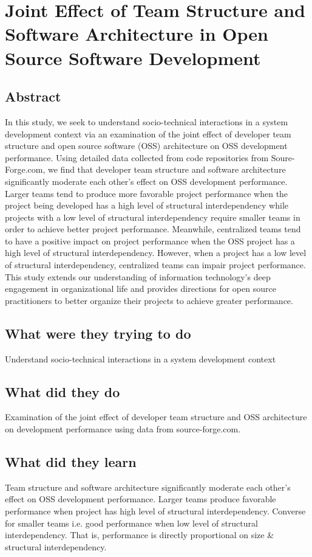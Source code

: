 \section{Joint Effect of Team Structure and Software Architecture in Open Source Software Development}

\subsection{Abstract}

In this study, we seek to understand socio-technical interactions in a system development context via an examination of the joint effect of developer team structure and open source software (OSS) architecture on OSS development performance. Using detailed data collected from code repositories from Soure-Forge.com, we find that developer team structure and software architecture significantly moderate each other's effect on OSS development performance. Larger teams tend to produce more favorable project performance when the project being developed has a high level of structural interdependency while projects with a low level of structural interdependency require smaller teams in order to achieve better project performance. Meanwhile, centralized teams tend to have a positive impact on project performance when the OSS project has a high level of structural interdependency. However, when a project has a low level of structural interdependency, centralized teams can impair project performance. This study extends our understanding of information technology's deep engagement in organizational life and provides directions for open source practitioners to better organize their projects to achieve greater performance.

\subsection{What were they trying to do}

Understand socio-technical interactions in a system development context

\subsection{What did they do}

Examination of the joint effect of developer team structure and OSS architecture on development performance using data from source-forge.com.

\subsection{What did they learn}

Team structure and software architecture significantly moderate each other's effect on OSS development performance. Larger teams produce favorable performance when project has high level of structural interdependency. Converse for smaller teams i.e. good performance when low level of structural interdependency. That is, performance is directly proportional on size & structural interdependency.
